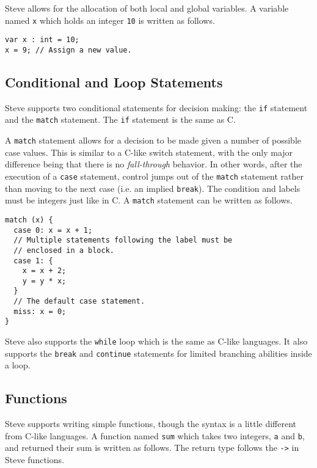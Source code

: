 Steve allows for the allocation of both local and global variables. 
A variable named \texttt{x} which holds an integer \texttt{10} is written
as follows. 

\begin{codepage}
\begin{lstlisting}
var x : int = 10;
x = 9; // Assign a new value.
\end{lstlisting}
\end{codepage}

\subsection{Conditional and Loop Statements} \label{tut:condition}

Steve supports two conditional statements for decision making: the \texttt{if} statement and the \texttt{match} statement. 
The \texttt{if} statement is the same as C.

A \texttt{match} statement allows for a decision to be made given a number of 
possible case values. 
This is similar to a C-like switch statement, with the only
major difference being that there is no \textit{fall-through} behavior. In other
words, after the execution of a \texttt{case} statement, control jumps out of the 
\texttt{match} statement rather than moving to the next case (i.e. an implied 
\texttt{break}). 
The condition and labels must be integers just like in C. 
A \texttt{match} statement can be written as follows.

\begin{codepage}
\begin{lstlisting}
match (x) {
  case 0: x = x + 1;
  // Multiple statements following the label must be
  // enclosed in a block.
  case 1: {
    x = x + 2;
    y = y * x;
  }
  // The default case statement.
  miss: x = 0;
}
\end{lstlisting}
\end{codepage}

Steve also supports the \texttt{while} loop which is the same as C-like languages. 
It also supports the \texttt{break} and \texttt{continue} statements for limited
branching abilities inside a loop. 

\subsection{Functions} \label{tut:function}

Steve supports writing simple functions, though the syntax is a little different
from C-like languages.
A function named \texttt{sum} which takes two
integers, \texttt{a} and \texttt{b}, and returned their sum is written as follows.
The return type follows the \texttt{->} in Steve functions.

